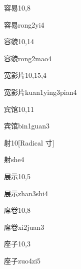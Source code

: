 \begin{entry}{容易}{10,8}
  \begin{phonetics}{容易}{rong2yi4}
  \end{phonetics}
\end{entry}

\begin{entry}{容貌}{10,14}
  \begin{phonetics}{容貌}{rong2mao4}
  \end{phonetics}
\end{entry}

\begin{entry}{宽影片}{10,15,4}
  \begin{phonetics}{宽影片}{kuan1ying3pian4}
  \end{phonetics}
\end{entry}

\begin{entry}{宾馆}{10,11}
  \begin{phonetics}{宾馆}{bin1guan3}
  \end{phonetics}
\end{entry}

\begin{entry}{射}{10}[Radical 寸]
  \begin{phonetics}{射}{she4}
  \end{phonetics}
\end{entry}

\begin{entry}{展示}{10,5}
  \begin{phonetics}{展示}{zhan3shi4}
  \end{phonetics}
\end{entry}

\begin{entry}{席卷}{10,8}
  \begin{phonetics}{席卷}{xi2juan3}
  \end{phonetics}
\end{entry}

\begin{entry}{座子}{10,3}
  \begin{phonetics}{座子}{zuo4zi5}
  \end{phonetics}
\end{entry}

